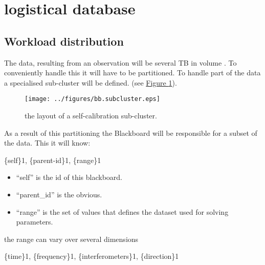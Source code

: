 \documentclass[]{lofar}
\begin{document}
  \section{logistical database}
  \label{sec:logistical-datamodel}
  \hypertarget{sec:logistical-datamodel}{}

    \subsection{Workload distribution}
    \label{subsec:workload-distribution-2}\hypertarget{subsec:workload-distribution-2}{}

      The data, resulting from an observation will be several TB in
      volume
      \cite{bib:LOFAR-ASTRON-MEM-035}. To
      conveniently handle this it will have to be partitioned. To
      handle part of the data a specialised sub-cluster will be
      defined. (see \hyperlink{fig:bb.subcluster}{Figure \ref{fig:bb.subcluster}}).

      \begin{figure}
        \texttt{[image: ../figures/bb.subcluster.eps]}
        \hypertarget{fig:bb.subcluster}{}
        \caption{the layout of a self-calibration sub-cluster.\label{fig:bb.subcluster}}
      \end{figure}

      As a result of this partitioning the Blackboard will be
      responsible for a subset of the data. This it will know:

      \{self\}1, \{parent-id\}1, \{range\}1

      \begin{itemize}

        \item 

          ``self'' is the id of this blackboard.

        \item 

          ``parent\_id'' is the obvious.

        \item 

          ``range'' is the set of values that defines the dataset used
          for solving parameters.

      \end{itemize}

      the range can vary over several dimensions

      \{time\}1, \{frequency\}1, \{interferometers\}1, \{direction\}1
\end{document}
